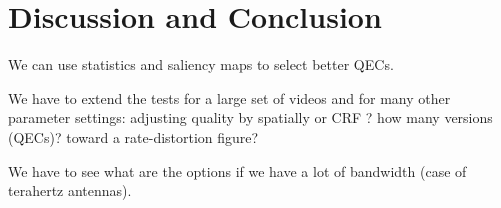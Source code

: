 \documentclass{sig-alternate}
\begin{document}
\section{Discussion and Conclusion}

We can use  statistics and saliency maps to select better \acp{QEC}.

We have to extend the tests for a large set of videos and for many other parameter settings: adjusting quality by spatially or CRF ? how many versions (QECs)? toward a rate-distortion figure?

We have to see what are the options if we have a lot of bandwidth (case of terahertz antennas).



\newpage
%
%
  
%  

\end{document}
